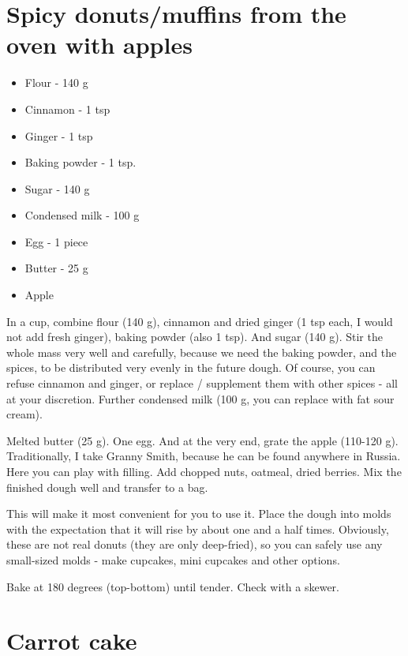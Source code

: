 \documentclass[
]{book}
\providecommand{\tightlist}{%
  \setlength{\itemsep}{0pt}\setlength{\parskip}{0pt}}
\begin{document}
\hypertarget{spicy-donutsmuffins-from-the-oven-with-apples}{%
\section{Spicy donuts/muffins from the oven with apples}\label{spicy-donutsmuffins-from-the-oven-with-apples}}

\begin{itemize}
\tightlist
\item
  Flour - 140 g
\item
  Cinnamon - 1 tsp
\item
  Ginger - 1 tsp
\item
  Baking powder - 1 tsp.
\item
  Sugar - 140 g
\item
  Condensed milk - 100 g
\item
  Egg - 1 piece
\item
  Butter - 25 g
\item
  Apple
\end{itemize}

In a cup, combine flour (140 g), cinnamon and dried ginger (1 tsp each, I would not add fresh ginger), baking powder (also 1 tsp). And sugar (140 g). Stir the whole mass very well and carefully, because we need the baking powder, and the spices, to be distributed very evenly in the future dough. Of course, you can refuse cinnamon and ginger, or replace / supplement them with other spices - all at your discretion. Further condensed milk (100 g, you can replace with fat sour cream).

Melted butter (25 g). One egg. And at the very end, grate the apple (110-120 g). Traditionally, I take Granny Smith, because he can be found anywhere in Russia. Here you can play with filling. Add chopped nuts, oatmeal, dried berries. Mix the finished dough well and transfer to a bag.

This will make it most convenient for you to use it. Place the dough into molds with the expectation that it will rise by about one and a half times. Obviously, these are not real donuts (they are only deep-fried), so you can safely use any small-sized molds - make cupcakes, mini cupcakes and other options.

Bake at 180 degrees (top-bottom) until tender. Check with a skewer.

\hypertarget{carrot-cake}{%
\section{Carrot cake}\label{carrot-cake}}
\end{document}
